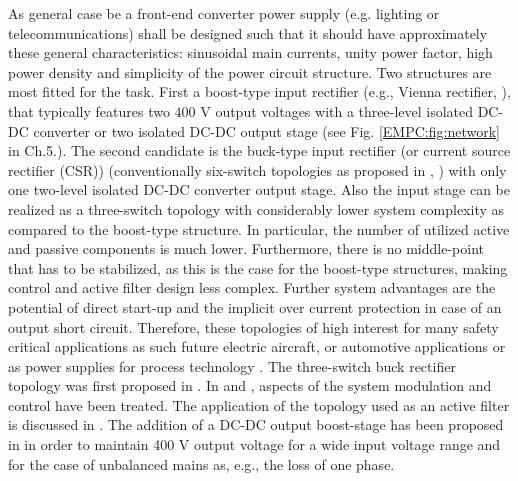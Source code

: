 

As  general case be a front-end  converter power supply (e.g. lighting or telecommunications) shall be designed such that it should have approximately these general characteristics: sinusoidal main currents, unity power factor, high power density and simplicity of the power circuit structure. Two structures are most fitted for the task. First a boost-type input rectifier (e.g., Vienna rectifier, \cite{kolar1996design}), that typically features two $400$ V output voltages with a three-level isolated  DC-DC  converter  or  two  isolated  DC-DC  output  stage (see Fig. \ref{EMPC:fig:network} in Ch.5.). The second candidate is the buck-type  input  rectifier (or current source rectifier (CSR))  (conventionally  six-switch topologies as proposed in \cite{zargari1993current}, \cite{sato1993state}) with only one two-level isolated  DC-DC  converter  output  stage.  Also the  input  stage  can be realized as a three-switch topology with considerably  lower  system  complexity  as  compared  to  the boost-type structure. In particular, the number of utilized active and passive components is much lower. Furthermore, there is no middle-point that has to be stabilized, as this is the case for the boost-type structures, making control and active filter design less complex. Further system advantages are the potential of direct start-up and the implicit over current protection in case of an output short circuit. Therefore, these topologies of high interest for many safety critical applications as such future electric aircraft, or automotive applications or as power supplies for process technology \cite{nussbaumer2007comprehensive}.
The three-switch buck rectifier topology was first proposed in \cite{malesani1987three}. In \cite{itoh1989steady} and \cite{tooth2000effects}, aspects of the system modulation and control have been treated. The application of the topology used as an active filter is discussed in \cite{salo2005three}.  The addition of a DC-DC output boost-stage has been proposed in \cite{baumannnew} in order to maintain 400 V output voltage for a wide input voltage range and for the case of unbalanced mains as, e.g., the loss of one phase.

\label{BASICCSR:sec:OperationPrinciple}

